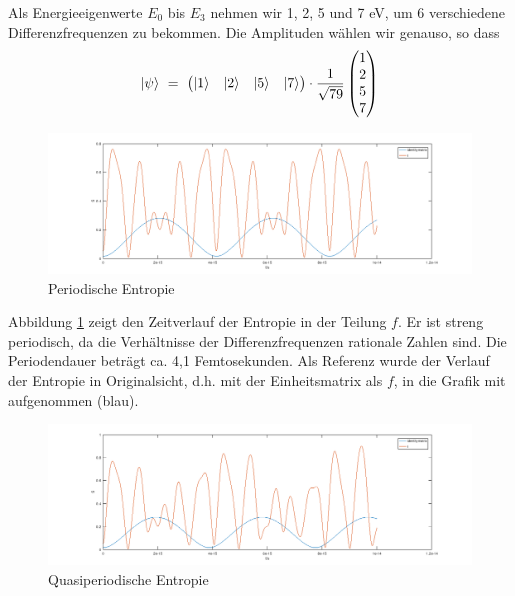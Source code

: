 \documentclass[12pt]{article}
\begin{document}
Als Energieeigenwerte $E_0$ bis $E_3$ nehmen wir 1, 2, 5 und 7 eV, um 6 verschiedene Differenzfrequenzen zu bekommen. Die Amplituden wählen wir genauso, so dass
\begin{equation*}
\ket{\psi}\ =\ \begin{pmatrix}
\ket{1} & \ket{2} & \ket{5} & \ket{7}
\end{pmatrix}
\cdot \frac{1}{\sqrt{79}}
\begin{pmatrix}
1 \\ 2 \\ 5 \\ 7
\end{pmatrix}
\end{equation*}
\begin{figure}[!h]\begin{center}
  \includegraphics[width=19cm]{periodic_entropy.png}
  \caption{Periodische Entropie}
  \label{fig:periodic_entropy}
\end{center}\end{figure}

Abbildung \ref{fig:periodic_entropy} zeigt den Zeitverlauf der Entropie in der Teilung $f$. Er ist streng periodisch, da die Verhältnisse der Differenzfrequenzen rationale Zahlen sind. Die Periodendauer beträgt ca. 4,1 Femtosekunden.
Als Referenz wurde der Verlauf der Entropie in Originalsicht, d.h. mit der Einheitsmatrix als $f$, in die Grafik mit aufgenommen (blau).
\begin{figure}[!h]\begin{center}
  \includegraphics[width=19cm]{quasi_periodic_entropy.png}
  \caption{Quasiperiodische Entropie}
  \label{fig:quasi_periodic_entropy}
\end{center}\end{figure}
\end{document}
